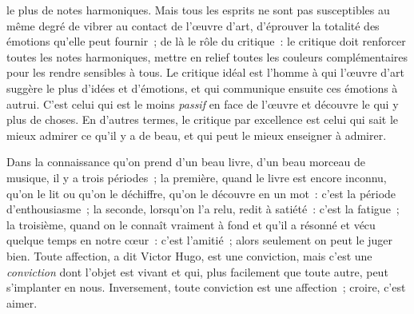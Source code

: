 \documentclass[french,twoside]{book} %
\begin{document}
le plus de notes harmoniques. Mais tous les esprits ne sont pas susceptibles au même degré de vibrer au contact de l’œuvre d’art, d’éprouver la totalité des émotions qu’elle peut fournir ; de là le rôle du critique : le critique doit renforcer toutes les notes harmoniques, mettre en relief toutes les couleurs complémentaires pour les rendre sensibles à tous. Le critique idéal est l’homme à qui l’œuvre d’art suggère le plus d’idées et d’émotions, et qui communique ensuite ces émotions à autrui. C’est celui qui est le moins \emph{passif} en face de l’œuvre et découvre le qui y plus de choses. En d’autres termes, le critique par excellence est celui qui sait le mieux admirer ce qu’il y a de beau, et qui peut le mieux enseigner à admirer.\par
Dans la connaissance qu’on prend d’un beau livre, d’un beau morceau de musique, il y a trois périodes ; la première, quand le livre est encore inconnu, qu’on le lit ou qu’on le déchiffre, qu’on le découvre en un mot : c’est la période d’enthousiasme ; la seconde, lorsqu’on l’a relu, redit à satiété : c’est la fatigue ; la troisième, quand on le connaît vraiment à fond et qu’il a résonné et vécu quelque temps en notre cœur : c’est l’amitié ; alors seulement on peut le juger bien. Toute affection, a dit Victor Hugo, est une conviction, mais c’est une \emph{conviction} dont l’objet est vivant et qui, plus facilement que toute autre, peut s’implanter en nous. Inversement, toute conviction est une affection ; croire, c’est aimer.\par
\end{document}
